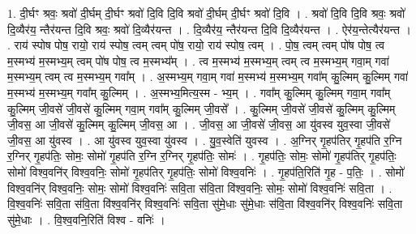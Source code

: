 \documentclass[17pt]{extarticle}
\begin{document}
1. दी॒र्घꣳ श्रवः॒ श्रवो॑ दी॒र्घम् दी॒र्घꣳ श्रवो॑ दि॒वि दि॒वि श्रवो॑ दी॒र्घम् दी॒र्घꣳ श्रवो॑ दि॒वि । . श्रवो॑ दि॒वि दि॒वि श्रवः॒ श्रवो॑ दि॒व्यैर॑य॒ न्तैर॑यन्त दि॒वि श्रवः॒ श्रवो॑ दि॒व्यैर॑यन्त । . दि॒व्यैर॑य॒ न्तैर॑यन्त दि॒वि दि॒व्यैर॑यन्त । . ऐर॑य॒न्तेत्यैर॑यन्त । . राय॑ स्पोष पोष॒ रायो॒ राय॑ स्पोष॒ त्वम् त्वम् पो॑ष॒ रायो॒ राय॑ स्पोष॒ त्वम् । . पो॒ष॒ त्वम् त्वम् पो॑ष पोष॒ त्व म॒स्मभ्य॑ म॒स्मभ्य॒म् त्वम् पो॑ष पोष॒ त्व म॒स्मभ्य᳚म् । . त्व म॒स्मभ्य॑ म॒स्मभ्य॒म् त्वम् त्व म॒स्मभ्य॒म् गवा॒म् गवा॑ म॒स्मभ्य॒म् त्वम् त्व म॒स्मभ्य॒म् गवा᳚म् । . अ॒स्मभ्य॒म् गवा॒म् गवा॑ म॒स्मभ्य॑ म॒स्मभ्य॒म् गवा᳚म् कु॒ल्मिम् कु॒ल्मिम् गवा॑ म॒स्मभ्य॑ म॒स्मभ्य॒म् गवा᳚म् कु॒ल्मिम् । . अ॒स्मभ्य॒मित्य॒स्म - भ्य॒म् । . गवा᳚म् कु॒ल्मिम् कु॒ल्मिम् गवा॒म् गवा᳚म् कु॒ल्मिम् जी॒वसे॑ जी॒वसे॑ कु॒ल्मिम् गवा॒म् गवा᳚म् कु॒ल्मिम् जी॒वसे᳚ । . कु॒ल्मिम् जी॒वसे॑ जी॒वसे॑ कु॒ल्मिम् कु॒ल्मिम् जी॒वस॒ आ जी॒वसे॑ कु॒ल्मिम् कु॒ल्मिम् जी॒वस॒ आ । . जी॒वस॒ आ जी॒वसे॑ जी॒वस॒ आ यु॑वस्व युव॒स्वा जी॒वसे॑ जी॒वस॒ आ यु॑वस्व । . आ यु॑वस्व युव॒स्वा यु॑वस्व । . यु॒व॒स्वेति॑ युवस्व । . अ॒ग्निर् गृ॒हप॑तिर् गृ॒हप॑ति र॒ग्नि र॒ग्निर् गृ॒हप॑तिः॒ सोमः॒ सोमो॑ गृ॒हप॑ति र॒ग्नि र॒ग्निर् गृ॒हप॑तिः॒ सोमः॑ । . गृ॒हप॑तिः॒ सोमः॒ सोमो॑ गृ॒हप॑तिर् गृ॒हप॑तिः॒ सोमो॑ विश्व॒वनि॑र् विश्व॒वनिः॒ सोमो॑ गृ॒हप॑तिर् गृ॒हप॑तिः॒ सोमो॑ विश्व॒वनिः॑ । . गृ॒हप॑ति॒रिति॑ गृ॒ह - प॒तिः॒ । . सोमो॑ विश्व॒वनि॑र् विश्व॒वनिः॒ सोमः॒ सोमो॑ विश्व॒वनिः॑ सवि॒ता स॑वि॒ता वि॑श्व॒वनिः॒ सोमः॒ सोमो॑ विश्व॒वनिः॑ सवि॒ता । . वि॒श्व॒वनिः॑ सवि॒ता स॑वि॒ता वि॑श्व॒वनि॑र् विश्व॒वनिः॑ सवि॒ता सु॑मे॒धाः सु॑मे॒धाः स॑वि॒ता वि॑श्व॒वनि॑र् विश्व॒वनिः॑ सवि॒ता सु॑मे॒धाः । . वि॒श्व॒वनि॒रिति॑ विश्व - वनिः॑ । \newline
\end{document}
